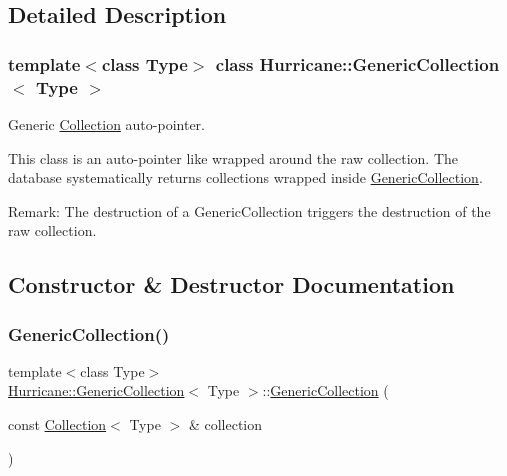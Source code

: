 \subsection{Detailed Description}
\subsubsection*{template$<$class Type$>$\newline
class Hurricane\+::\+Generic\+Collection$<$ Type $>$}

Generic \mbox{\hyperlink{classHurricane_1_1Collection}{Collection}} auto-\/pointer. 

This class is an auto-\/pointer like wrapped around the raw collection. The database systematically returns collections wrapped inside \mbox{\hyperlink{classHurricane_1_1GenericCollection}{Generic\+Collection}}.

\begin{DoxyParagraph}{Remark\+: The destruction of a Generic\+Collection triggers the destruction of}
the raw collection. 
\end{DoxyParagraph}


\subsection{Constructor \& Destructor Documentation}
\mbox{\label{classHurricane_1_1GenericCollection_a177ca321f1b7761c8b000a59051ba9f9}} 
\subsubsection{\texorpdfstring{Generic\+Collection()}{GenericCollection()}\hspace{0.1cm}{\footnotesize\ttfamily [1/3]}}
{\footnotesize\ttfamily template$<$class Type$>$ \\
\mbox{\hyperlink{classHurricane_1_1GenericCollection}{Hurricane\+::\+Generic\+Collection}}$<$ Type $>$\+::\mbox{\hyperlink{classHurricane_1_1GenericCollection}{Generic\+Collection}} (\begin{DoxyParamCaption}\item[{const \mbox{\hyperlink{classHurricane_1_1Collection}{Collection}}$<$ Type $>$ \&}]{collection }\end{DoxyParamCaption})\hspace{0.3cm}{\ttfamily [inline]}}


